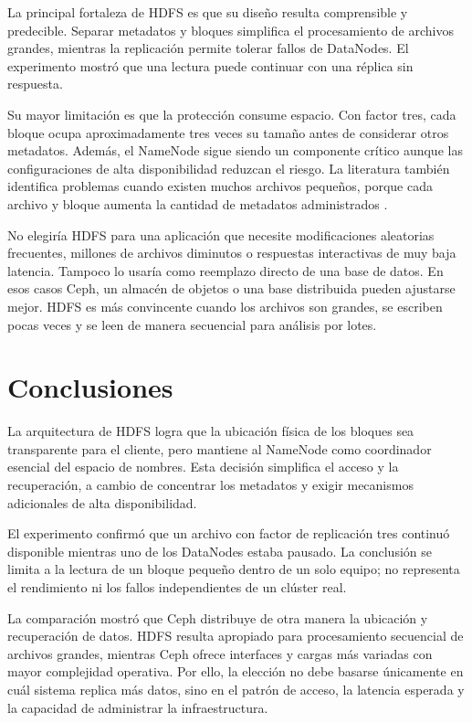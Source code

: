 \documentclass[12pt,a4paper]{article}
\begin{document}
La principal fortaleza de HDFS es que su diseño resulta comprensible y predecible. Separar metadatos y bloques simplifica el procesamiento de archivos grandes, mientras la replicación permite tolerar fallos de DataNodes. El experimento mostró que una lectura puede continuar con una réplica sin respuesta.

Su mayor limitación es que la protección consume espacio. Con factor tres, cada bloque ocupa aproximadamente tres veces su tamaño antes de considerar otros metadatos. Además, el NameNode sigue siendo un componente crítico aunque las configuraciones de alta disponibilidad reduzcan el riesgo. La literatura también identifica problemas cuando existen muchos archivos pequeños, porque cada archivo y bloque aumenta la cantidad de metadatos administrados \cite{dhulavvagol2023federation}.

No elegiría HDFS para una aplicación que necesite modificaciones aleatorias frecuentes, millones de archivos diminutos o respuestas interactivas de muy baja latencia. Tampoco lo usaría como reemplazo directo de una base de datos. En esos casos Ceph, un almacén de objetos o una base distribuida pueden ajustarse mejor. HDFS es más convincente cuando los archivos son grandes, se escriben pocas veces y se leen de manera secuencial para análisis por lotes.

\section{Conclusiones}

La arquitectura de HDFS logra que la ubicación física de los bloques sea transparente para el cliente, pero mantiene al NameNode como coordinador esencial del espacio de nombres. Esta decisión simplifica el acceso y la recuperación, a cambio de concentrar los metadatos y exigir mecanismos adicionales de alta disponibilidad.

El experimento confirmó que un archivo con factor de replicación tres continuó disponible mientras uno de los DataNodes estaba pausado. La conclusión se limita a la lectura de un bloque pequeño dentro de un solo equipo; no representa el rendimiento ni los fallos independientes de un clúster real.

La comparación mostró que Ceph distribuye de otra manera la ubicación y recuperación de datos. HDFS resulta apropiado para procesamiento secuencial de archivos grandes, mientras Ceph ofrece interfaces y cargas más variadas con mayor complejidad operativa. Por ello, la elección no debe basarse únicamente en cuál sistema replica más datos, sino en el patrón de acceso, la latencia esperada y la capacidad de administrar la infraestructura.
\end{document}
